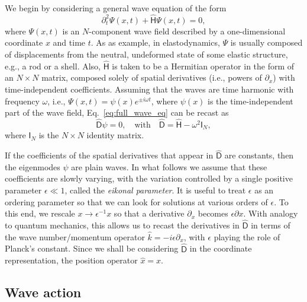 We begin by considering a general wave equation of the form
%
\begin{equation}
  \partial_{t}^{2}\Psi(x,t) + \widehat{\mathsf{H}}\Psi(x,t) = 0,
  \label{eq:full_wave_eq}
\end{equation}
%
where $\Psi(x,t)$ is an $N$-component wave field described by a one-dimensional coordinate $x$ and time $t$.
As as example, in elastodynamics, $\Psi$ is usually composed of displacements from the neutral, undeformed state of some elastic structure, e.g., a rod or a shell.
Also, $\widehat{\mathsf{H}}$ is taken to be a Hermitian operator in the form of an $N\times N$ matrix, composed solely of spatial derivatives (i.e., powers of $\partial_{x}$) with time-independent coefficients.
Assuming that the waves are time harmonic with frequency $\omega$, i.e., $\Psi(x, t) = \psi(x)e^{\pm i\omega t}$, where $\psi(x)$ is the time-independent part of the wave field, Eq.~\eqref{eq:full_wave_eq} can be recast as
%
\begin{equation}
  \widehat{\mathsf{D}}\psi = 0,\quad \text{with}\quad \widehat{\mathsf{D}} = \widehat{\mathsf{H}} - \omega^{2}\mathsf{I}_{N},
  \label{eq:ev_problem}
\end{equation}
%
where $\mathsf{I}_{N}$ is the $N\times N$ identity matrix.

If the coefficients of the spatial derivatives that appear in $\widehat{\mathsf{D}}$ are constants, then the eigenmodes $\psi$ are plain waves.
In what follows we assume that these coefficients are slowly varying, with the variation controlled by a single positive parameter $\epsilon \ll 1$, called the \emph{eikonal parameter}.
It is useful to treat $\epsilon$ as an ordering parameter so that we can look for solutions at various orders of $\epsilon$.
To this end, we rescale $x \to \epsilon^{-1}x$ so that a derivative $\partial_{x}$ becomes $\epsilon \partial x$.
With analogy to quantum mechanics, this allows us to recast the derivatives in $\widehat{\mathsf{D}}$ in terms of the wave number/momentum operator $\hat{k} = -i\epsilon \partial_{x}$, with $\epsilon$ playing the role of Planck's constant.
Since we shall be considering $\widehat{\mathsf{D}}$ in the coordinate representation, the position operator $\hat{x} = x$.

\subsection{Wave action}

